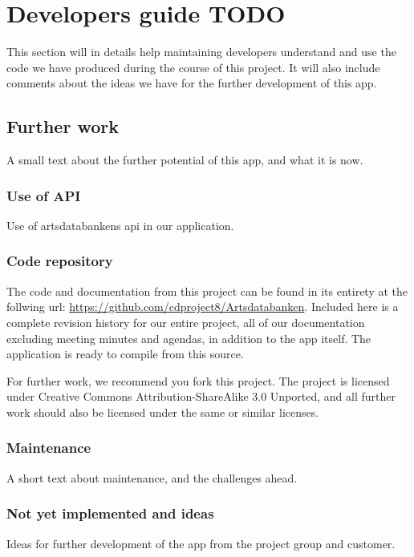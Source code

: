 \section{Developers guide TODO}
This section will in details help maintaining developers understand and use the code we have produced during the course of this project. It will also include comments about the ideas we have for the further development of this app.

\subsection{Further work}
A small text about the further potential of this app, and what it is now.
\subsubsection{Use of API}
Use of artsdatabankens api in our application.

\subsubsection{Code repository}
The code and documentation from this project can be found in its entirety at the follwing url: \url{https://github.com/cdproject8/Artsdatabanken}. Included here is a complete revision history for our entire project, all of our documentation excluding meeting minutes and agendas, in addition to the app itself. The application is ready to compile from this source.

For further work, we recommend you fork this project. The project is licensed under Creative Commons Attribution-ShareAlike 3.0 Unported, and all further work should also be licensed under the same or similar licenses. 

\subsubsection{Maintenance}
A short text about maintenance, and the challenges ahead.

\subsubsection{Not yet implemented and ideas}
Ideas for further development of the app from the project group and customer.

